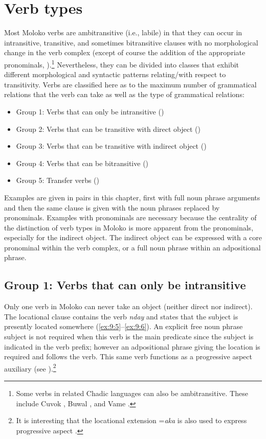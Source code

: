 \section{Verb types}\label{sec:9.2}
\hypertarget{RefHeading1212661525720847}{}
Most Moloko verbs are ambitransitive (i.e., labile) in that they can occur in intransitive, transitive, and sometimes bitransitive clauses with no morphological change in the verb complex (except of course the addition of the appropriate pronominals, ).\footnote{Some verbs in related Chadic languages can also be ambitransitive. These include Cuvok \citep{Ndokobai2006},  Buwal \citep{Viljoen2013}, and Vame \citep{Kinnaird2006}.} Nevertheless, they can be divided into classes that exhibit different morphological and syntactic patterns relating/with respect to transitivity. Verbs are classified here as to the maximum number of grammatical relations that the verb can take as well as the type of grammatical relations: %

\largerpage
\begin{itemize}
\item Group 1: Verbs that can only be intransitive ()
\item Group 2: Verbs that can be transitive with direct object ()
\item Group 3: Verbs that can be transitive with indirect object ()
\item Group 4: Verbs that can be bitransitive ()
\item Group 5: Transfer verbs ()
\end{itemize}

Examples are given in pairs in this chapter, first with full noun phrase arguments and then the same clause is given with the noun phrases replaced by pronominals. Examples with pronominals are necessary because the centrality of the distinction of verb types in Moloko is more apparent from the pronominals, especially for the indirect object. The indirect object can be expressed with a core pronominal within the verb complex, or a full noun phrase within an adpositional phrase. 

\subsection{Group 1: Verbs that can only be intransitive}\label{sec:9.2.1}
\hypertarget{RefHeading1212681525720847}{}
Only one verb in Moloko can never take an object (neither direct nor indirect). The locational clause contains the verb \textit{nday} and states that the subject is presently located somewhere (\ref{ex:9:5}--\ref{ex:9:6}). An explicit free noun phrase subject is not required when this verb is the main predicate since the subject is indicated in the verb prefix; however an adpositional phrase giving the location is required and follows the verb. This same verb functions as a progressive aspect auxiliary (see ).\footnote{It is interesting that the locational extension =\textit{aka} is also used to express progressive aspect .}

